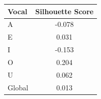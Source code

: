 \begin{tabular}{lc}
\toprule
\rowcolor{col01}
Vocal & Silhouette Score \\
\midrule
A & -0.078 \\
E & 0.031 \\
I & -0.153 \\
O & 0.204 \\
U & 0.062 \\
Global & 0.013 \\
\bottomrule
\end{tabular}

